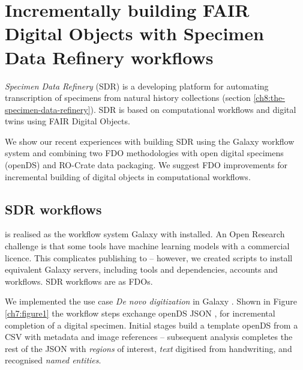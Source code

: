 \section[Incrementally building FAIR Digital Objects with the Specimen Data Refinery]{Incrementally building FAIR Digital Objects with Specimen Data Refinery workflows}
\label{ch7:incrementally-building-fair-digital-objects-with-specimen-data-refinery-workflows}

\emph{Specimen Data Refinery} (SDR) is a developing platform for
automating transcription of specimens from natural history collections
\cite{Hardisty 2022} (section \vref{ch8:the-specimen-data-refinery}). SDR is
based on computational workflows and digital twins using FAIR Digital
Objects.

We show our recent experiences with building SDR using the Galaxy
workflow system and combining two FDO methodologies with open digital
specimens (openDS) and RO-Crate data packaging. We suggest FDO
improvements for incremental building of digital objects in
computational workflows.

\subsection{SDR workflows}\label{ch7:sdr-workflows}

 is realised as the workflow system
Galaxy \cite{Afgan 2018} with
 installed. An Open
Research challenge is that some tools have machine learning models with
a commercial licence. This complicates publishing to
 -- however, we
created  scripts to install
equivalent Galaxy servers, including tools and dependencies, accounts
and workflows. SDR workflows are
 as
FDOs.

We implemented the use case \emph{De novo digitization} in Galaxy \cite{Brack 2022}.
Shown in Figure \vref{ch7:figure1} the
workflow steps exchange openDS JSON \cite{Hardisty 2019}, for
incremental completion of a digital specimen. Initial stages build a
template openDS from a CSV with metadata and image references --
subsequent analysis completes the rest of the JSON with \emph{regions}
of interest, \emph{text} digitised from handwriting, and recognised
\emph{named entities}.

